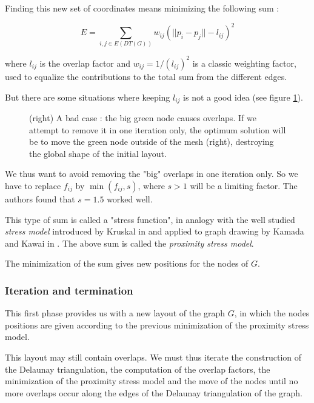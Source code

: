 \documentclass[12pt]{report}
\begin{document}
Finding this new set of coordinates means minimizing the following sum :

\[ E = \sum_{i,j \in E(DT(G))} w_{ij}(||p_i - p_j|| - l_{ij})^2\]

where $l_{ij}$ is the overlap factor and $w_{ij} = 1/(l_{ij})^2$ is a classic weighting factor, used to equalize the contributions to the total sum from the different edges.


But there are some situations where keeping $l_{ij}$ is not a good idea (see figure \ref{badcase}).

\begin{figure}[h]
	\center
  \setlength\fboxsep{5pt}
  \setlength\fboxrule{0.5pt}
  \caption{(right) A bad case : the big green node causes overlaps. If we attempt to remove it in one iteration only, the optimum solution will be to move the green node outside of the mesh (right), destroying the global shape of the initial layout.}
  \label{badcase}
\end{figure}

We thus want to avoid removing the "big" overlaps in one iteration only.
So we have to replace $f_{ij}$ by $\min(f_{ij},s)$, where $s > 1$ will be a limiting factor. The authors found that $s = 1.5$ worked well.

This type of sum is called a "stress function", in analogy with the well studied \emph{stress model} introduced by Kruskal in \cite{Kruskal64} and applied to graph drawing by Kamada and Kawai in \cite{Kamada89}. 
The above sum is called the \emph{proximity stress model}.

\bigskip
The minimization of the sum gives new positions for the nodes of $G$.

\subsubsection{Iteration and termination}
This first phase provides us with a new layout of the graph $G$, in which the nodes positions are given according to the previous minimization of the proximity stress model.

This layout may still contain overlaps. We must thus iterate the construction of the Delaunay triangulation, the computation of the overlap factors, the minimization of the proximity stress model and the move of the nodes until no more overlaps occur along the edges of the Delaunay triangulation of the graph.
\end{document}
